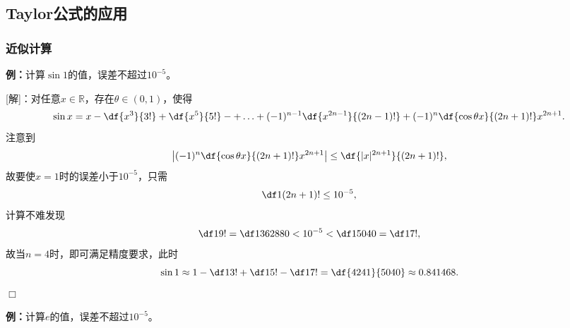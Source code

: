 \subsection{Taylor公式的应用}

\subsubsection{近似计算}

{\bf 例：}计算$\sin 1$的值，误差不超过$10^{-5}$。

[解]：对任意$x\in\mathbb{R}$，存在$\theta\in(0,1)$，使得
$$\sin x=x-\df{x^3}{3!}+\df{x^5}{5!}-+\ldots
+(-1)^{n-1}\df{x^{2n-1}}{(2n-1)!}
+(-1)^{n}\df{\cos\theta x}{(2n+1)!}x^{2n+1}.$$
注意到
$$\left|(-1)^{n}\df{\cos\theta x}{(2n+1)!}x^{2n+1}\right|
\leq\df{|x|^{2n+1}}{(2n+1)!},$$
故要使$x=1$时的误差小于$10^{-5}$，只需
$$\df1{(2n+1)!}\leq 10^{-5},$$
计算不难发现
$$\df1{9!}=\df1{362880}<10^{-5}<\df1{5040}=\df1{7!},$$
故当$n=4$时，即可满足精度要求，此时
$$\sin 1\approx 1-\df1{3!}+\df1{5!}-\df1{7!}=\df{4241}{5040}\approx 0.841468.$$
\hfill$\Box$

{\bf 例：}计算$e$的值，误差不超过$10^{-5}$。

